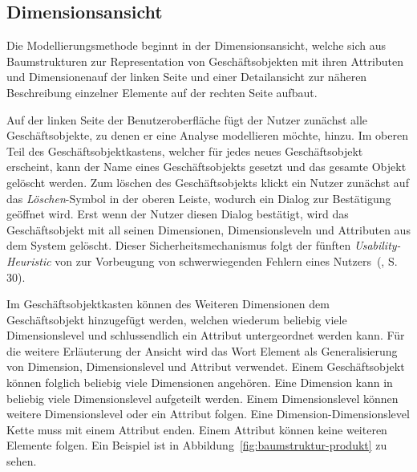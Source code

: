 \documentclass[
  language=german, %
  type=bachelor,%
  ngerman
]{isthesis}
\begin{document}
\begin{content}
  \subsection{Dimensionsansicht}

  Die Modellierungsmethode beginnt in der Dimensionsansicht, welche sich aus
  Baumstrukturen zur Representation von Geschäftsobjekten mit ihren Attributen
  und Dimensionenauf der linken Seite und einer Detailansicht zur näheren
  Beschreibung einzelner Elemente auf der rechten Seite aufbaut. 

  Auf der linken Seite der Benutzeroberfläche fügt der Nutzer zunächst alle
  Geschäftsobjekte, zu denen er eine Analyse modellieren möchte, hinzu. Im
  oberen Teil des Geschäftsobjektkastens, welcher für jedes neues Geschäftsobjekt erscheint, kann
  der Name eines Geschäftsobjekts gesetzt und das gesamte Objekt gelöscht
  werden. Zum löschen des Geschäftsobjekts klickt ein Nutzer zunächst auf das
  \textit{Löschen}-Symbol in der oberen Leiste, wodurch ein Dialog zur
  Bestätigung geöffnet wird. Erst wenn der Nutzer diesen Dialog bestätigt, wird
  das Geschäftsobjekt mit all seinen Dimensionen, Dimensionsleveln und
  Attributen aus dem System gelöscht. Dieser Sicherheitsmechanismus folgt der
  fünften \textit{Usability-Heuristic} von
  \textsc{\citeauthor{nielsen1994heuristic}} zur Vorbeugung von schwerwiegenden
  Fehlern eines Nutzers~(\citeyear{nielsen1994heuristic}, S. 30).

  Im Geschäftsobjektkasten können des Weiteren Dimensionen dem Geschäftsobjekt
  hinzugefügt werden, welchen wiederum beliebig viele Dimensionslevel und
  schlussendlich ein Attribut untergeordnet werden kann. Für die weitere
  Erläuterung der Ansicht wird das Wort Element als Generalisierung von
  Dimension, Dimensionslevel und Attribut verwendet.  Einem
  Geschäftsobjekt können folglich beliebig viele Dimensionen angehören. Eine
  Dimension kann in beliebig viele Dimensionslevel aufgeteilt werden. Einem
  Dimensionslevel können weitere Dimensionslevel oder ein Attribut folgen. Eine
  Dimension-Dimensionslevel Kette muss mit einem Attribut enden. Einem Attribut
  können keine weiteren Elemente folgen. Ein Beispiel ist in
  Abbildung~\ref{fig:baumstruktur-produkt} zu sehen.

	\begin{figure}
		\footnotesize


\end{figure}
\end{content}
\end{document}
